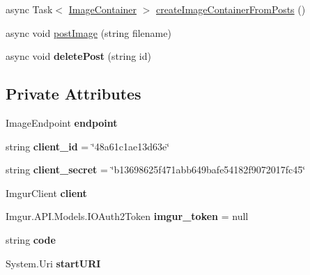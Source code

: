 \begin{DoxyCompactItemize}
\item 
async Task$<$ \mbox{\hyperlink{classepicture_1_1_image_container}{Image\+Container}} $>$ \mbox{\hyperlink{classepicture_1_1_imgur_api_a7d7e217e9bbe707827de3f3222245ba8}{create\+Image\+Container\+From\+Posts}} ()
\item 
async void \mbox{\hyperlink{classepicture_1_1_imgur_api_a9f5cec5e327a823db214ff4d4738197a}{post\+Image}} (string filename)
\item 
\mbox{\label{classepicture_1_1_imgur_api_aeb84a9fc83ef5d634a9196654384eb5b}} 
async void {\bfseries delete\+Post} (string id)
\end{DoxyCompactItemize}
\subsection*{Private Attributes}
\begin{DoxyCompactItemize}
\item 
\mbox{\label{classepicture_1_1_imgur_api_abef6924a5498e830d010efeb123f6f47}} 
Image\+Endpoint {\bfseries endpoint}
\item 
\mbox{\label{classepicture_1_1_imgur_api_a586a3f3f53f1756ae50c9e93510a8bce}} 
string {\bfseries client\+\_\+id} = \char`\"{}48a61c1ae13d63e\char`\"{}
\item 
\mbox{\label{classepicture_1_1_imgur_api_ab60d5532ab41ea9bde7a969b5c3fd2dd}} 
string {\bfseries client\+\_\+secret} = \char`\"{}b13698625f471abb649bafe54182f9072017fc45\char`\"{}
\item 
\mbox{\label{classepicture_1_1_imgur_api_af02533519ecbc6ae360cba70b018ad7c}} 
Imgur\+Client {\bfseries client}
\item 
\mbox{\label{classepicture_1_1_imgur_api_a3b33cd29b24711a06741aaf8f6ba36a2}} 
Imgur.\+A\+P\+I.\+Models.\+I\+O\+Auth2\+Token {\bfseries imgur\+\_\+token} = null
\item 
\mbox{\label{classepicture_1_1_imgur_api_ae758696dd1bb39b19c4b58600eb5bc5c}} 
string {\bfseries code}
\item 
\mbox{\label{classepicture_1_1_imgur_api_a5362931aa20d3188facc9a043c376efe}} 
System.\+Uri {\bfseries start\+U\+RI}
\end{DoxyCompactItemize}
